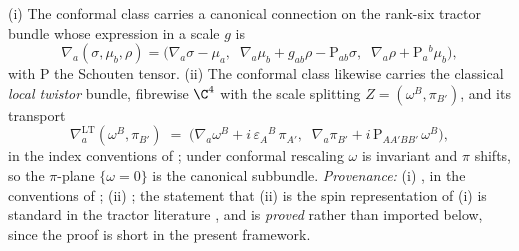 (i) The conformal class carries a canonical connection on the rank-six tractor bundle whose expression in a scale $g$ is
\[
\nabla_a(\sigma, \mu_b, \rho) = \bigl(\nabla_a\sigma - \mu_a,\;\; \nabla_a\mu_b + g_{ab}\rho - \mathrm{P}_{ab}\sigma,\;\; \nabla_a\rho + \mathrm{P}_a{}^b\mu_b\bigr),
\]
with $\mathrm{P}$ the Schouten tensor. (ii) The conformal class likewise carries the classical \emph{local twistor} bundle, fibrewise $\C^4$ with the scale splitting $Z = (\omega^B, \pi_{B'})$, and its transport
\[
\nabla^{\mathrm{LT}}_a(\omega^B, \pi_{B'}) \;=\; \bigl(\nabla_a \omega^B + i\,\varepsilon_A{}^B\,\pi_{A'},\;\; \nabla_a\pi_{B'} + i\,\mathrm{P}_{AA'BB'}\,\omega^B\bigr),
\]
in the index conventions of \cite[Vol.~2, Ch.~6]{PenroseRindler86}; under conformal rescaling $\omega$ is invariant and $\pi$ shifts, so the $\pi$-plane $\{\omega = 0\}$ is the canonical subbundle. \emph{Provenance:} (i) \cite{BEG1994, CurryGover2018}, in the conventions of \cite[Fact 4.1, eq.~(3)]{ButlerT6}; (ii) \cite{PenroseMacCallum73, Dighton74}; the statement that (ii) is the spin representation of (i) is standard in the tractor literature \cite{BEG1994, CurryGover2018}, and is \emph{proved} rather than imported below, since the proof is short in the present framework.
